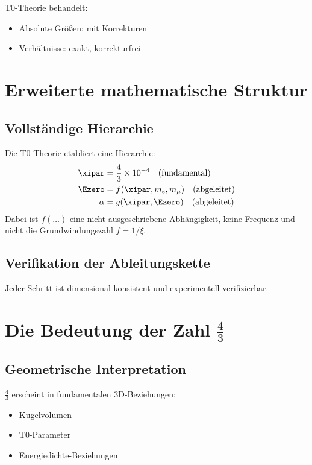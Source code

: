 	T0-Theorie behandelt:
	\begin{itemize}
		\item Absolute Größen: mit Korrekturen
		\item Verhältnisse: exakt, korrekturfrei
	\end{itemize}
	
	\section{Erweiterte mathematische Struktur}
	
	\subsection{Vollständige Hierarchie}
	
	Die T0-Theorie etabliert eine Hierarchie:
	\begin{align}
		\xipar &= \frac{4}{3} \times 10^{-4} \quad \text{(fundamental)} \\
		\Ezero &= f(\xipar, m_e, m_\mu) \quad \text{(abgeleitet)} \\
		\alpha &= g(\xipar, \Ezero) \quad \text{(abgeleitet)}
	\end{align}
	Dabei ist $f(\ldots)$ eine nicht ausgeschriebene Abhängigkeit, keine Frequenz und nicht die Grundwindungszahl $f = 1/\xi$.

	\subsection{Verifikation der Ableitungskette}
	
	Jeder Schritt ist dimensional konsistent und experimentell verifizierbar.
	
	\section[Die Bedeutung der Zahl 4/3]{Die Bedeutung der Zahl $\frac{4}{3}$}
	
	\subsection{Geometrische Interpretation}
	
	$\frac{4}{3}$ erscheint in fundamentalen 3D-Beziehungen:
	\begin{itemize}
		\item Kugelvolumen
		\item T0-Parameter
		\item Energiedichte-Beziehungen
	\end{itemize}
	
